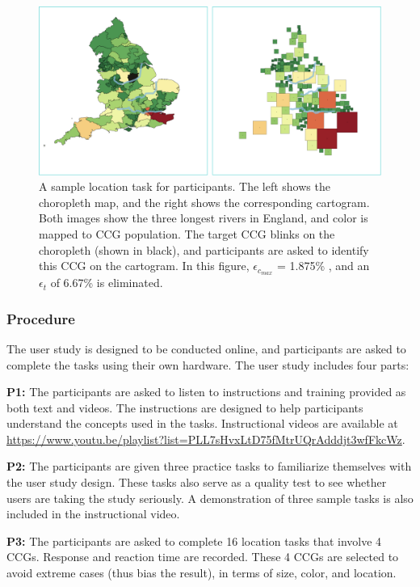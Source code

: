 \documentclass[Afour,sagev,times]{sagej}
\newcommand{\nodeError}{\epsilon}
\newcommand{\nodeCartographicErrorMax}{\nodeError_{c_{max}}}
\newcommand{\nodeTopologicalError}{\nodeError_{t}}
\begin{document}
    {
        \begin{figure}[tb!]
            \centering
            \includegraphics[width=\columnwidth,keepaspectratio]{task.png}
            \caption{A sample location task for participants. The left shows the choropleth map, and the right shows the corresponding cartogram. Both images show the three longest rivers in England, and color is mapped to CCG population. The target CCG blinks on the choropleth (shown in black), and participants are asked to identify this CCG on the cartogram. In this figure, $ \nodeCartographicErrorMax $ = 1.875\% , and an $ \nodeTopologicalError $ of 6.67\% is eliminated. }
            \label{fig:task}
        \end{figure}
    }

\subsubsection{Procedure}
\label{subsec:{Procedure}}

The user study is designed to be conducted online, and participants are asked to complete the tasks using their own hardware. The user study includes four parts:

\textbf{P1:} The participants are asked to listen to instructions and training provided as both text and videos. The instructions are designed to help participants understand the concepts used in the tasks. Instructional videos are available at \url{https://www.youtu.be/playlist?list=PLL7sHvxLtD75fMtrUQrAdddjt3wfFkcWz}.

\textbf{P2:} The participants are given three practice tasks to familiarize themselves with the user study design. These tasks also serve as a quality test to see whether users are taking the study seriously. A demonstration of three sample tasks is also included in the instructional video.

\textbf{P3:} The participants are asked to complete 16 location tasks that involve 4 CCGs. Response and reaction time are recorded. These 4 CCGs are selected to avoid extreme cases (thus bias the result), in terms of size, color, and location.
\end{document}
